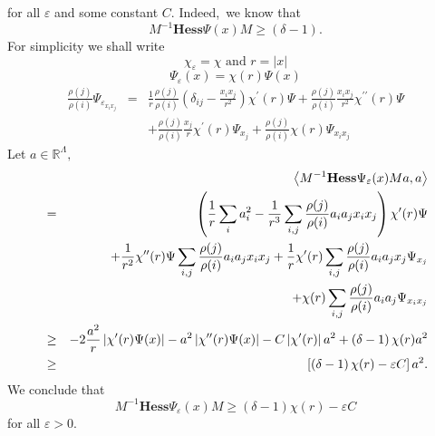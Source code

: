 \documentclass{article}
\begin{document}
for all $\varepsilon $ and some constant $C.$ Indeed,\ we know that 
\begin{equation*}
M^{-1}\mathbf{Hess}\Psi (x)M\geq \left( \delta -1\right) .
\end{equation*}%
For simplicity we shall write 
\begin{equation*}
\chi _{\varepsilon }=\chi \text{ \ and }r=\left| x\right|
\end{equation*}%
\begin{equation*}
\Psi _{\varepsilon }(x)=\chi (r)\Psi (x)
\end{equation*}%
\begin{eqnarray*}
\frac{\rho (j)}{\rho (i)}\Psi _{\varepsilon _{x_{i}x_{j}}} &=&\frac{1}{r}%
\frac{\rho (j)}{\rho (i)}\left( \delta _{ij}-\frac{x_{i}x_{j}}{r^{2}}\right)
\chi ^{\prime }(r)\Psi +\frac{\rho (j)}{\rho (i)}\frac{x_{i}x_{j}}{r^{2}}%
\chi ^{\prime \prime }(r)\Psi \\
&&+\frac{\rho (j)}{\rho (i)}\frac{x_{j}}{r}\chi ^{\prime }(r)\Psi _{x_{j}}+%
\frac{\rho (j)}{\rho (i)}\chi (r)\Psi _{x_{i}x_{j}}
\end{eqnarray*}%
Let $a\in \mathbb{R}^{\Lambda },$ 
\begin{eqnarray*}
&&\left\langle M^{-1}\mathbf{Hess}\Psi _{\varepsilon }(x)Ma,a\right\rangle \\
&=&\left( \frac{1}{r}\sum_{i}a_{i}^{2}-\frac{1}{r^{3}}\sum_{i,j}\frac{\rho
(j)}{\rho (i)}a_{i}a_{j}x_{i}x_{j}\right) \chi ^{\prime }(r)\Psi \\
&&+\frac{1}{r^{2}}\chi ^{\prime \prime }(r)\Psi \sum_{i,j}\frac{\rho (j)}{%
\rho (i)}a_{i}a_{j}x_{i}x_{j}+\frac{1}{r}\chi ^{\prime }(r)\sum_{i,j}\frac{%
\rho (j)}{\rho (i)}a_{i}a_{j}x_{j}\Psi _{x_{j}} \\
&&+\chi (r)\sum_{i,j}\frac{\rho (j)}{\rho (i)}a_{i}a_{j}\Psi _{x_{i}x_{j}} \\
&\geq &-2\frac{a^{2}}{r}\left| \chi ^{\prime }(r)\Psi (x)\right|
-a^{2}\left| \chi ^{\prime \prime }(r)\Psi (x)\right| -C\left| \chi ^{\prime
}(r)\right| a^{2}+\left( \delta -1\right) \chi (r)a^{2} \\
&\geq &\left[ \left( \delta -1\right) \chi (r)-\varepsilon C\right] a^{2}.
\end{eqnarray*}%
We conclude that \newline
\begin{equation*}
M^{-1}\mathbf{Hess}\Psi _{\varepsilon }(x)M\geq \left( \delta -1\right) \chi
(r)-\varepsilon C
\end{equation*}%
for all $\varepsilon >0.$\newline
\end{document}
